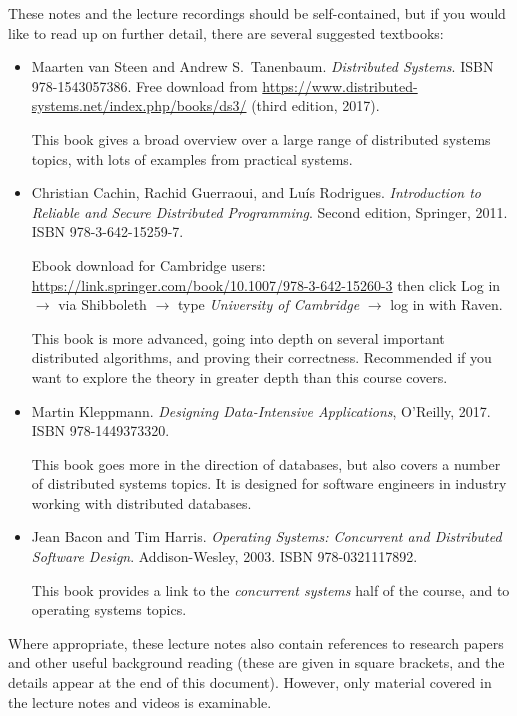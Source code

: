 These notes and the lecture recordings should be self-contained, but if you would like to read up on further detail, there are several suggested textbooks:
\begin{itemize}
    \item Maarten van Steen and Andrew S.\ Tanenbaum. \emph{Distributed Systems}. ISBN 978-1543057386.
        Free download from \url{https://www.distributed-systems.net/index.php/books/ds3/} (third edition, 2017).

        This book gives a broad overview over a large range of distributed systems topics, with lots of examples from practical systems.

    \item Christian Cachin, Rachid Guerraoui, and Luís Rodrigues.
        \emph{Introduction to Reliable and Secure Distributed Programming}.
        Second edition, Springer, 2011. ISBN 978-3-642-15259-7.

        Ebook download for Cambridge users: \url{https://link.springer.com/book/10.1007/978-3-642-15260-3} then click Log in $\rightarrow$ via Shibboleth $\rightarrow$ type \emph{University of Cambridge} $\rightarrow$ log in with Raven.

        This book is more advanced, going into depth on several important distributed algorithms, and proving their correctness.
        Recommended if you want to explore the theory in greater depth than this course covers.

    \item Martin Kleppmann. \emph{Designing Data-Intensive Applications}, O'Reilly, 2017. ISBN 978-1449373320.

        This book goes more in the direction of databases, but also covers a number of distributed systems topics.
        It is designed for software engineers in industry working with distributed databases.

    \item Jean Bacon and Tim Harris. \emph{Operating Systems: Concurrent and Distributed Software Design}.
        Addison-Wesley, 2003. ISBN 978-0321117892.

        This book provides a link to the \emph{concurrent systems} half of the course, and to operating systems topics.
\end{itemize}

Where appropriate, these lecture notes also contain references to research papers and other useful background reading (these are given in square brackets, and the details appear at the end of this document).
However, only material covered in the lecture notes and videos is examinable.

